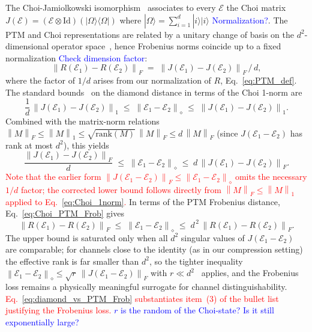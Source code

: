 \documentclass[%
 reprint,
superscriptaddress,
 amsmath,amssymb,
 aps,
]{revtex4-2}
\newcommand{\E}{\mathcal{E}}
\newcommand{\norm}[1]{\left\lVert#1\right\rVert}
\newcommand{\todoflag}[1]{\textcolor{red}{#1}}%
\newcommand{\yijian}[1]{\textcolor{blue}{#1}}
\begin{document}
The Choi-Jamiolkowski isomorphism~\cite{choi1975positive,jamiolkowski1972linear} associates to every $\E$ the Choi matrix $J(\E) = (\E\otimes\mathrm{Id})(|\Omega\rangle\langle\Omega|)$ where $|\Omega\rangle=\sum_{i=1}^d|i\rangle|i\rangle$ \yijian{Normalization?}. The PTM and Choi representations are related by a unitary change of basis on the $d^2$-dimensional operator space~\cite{greenbaum2015gst}, hence Frobenius norms coincide up to a fixed normalization  \yijian{Check dimension factor}:
\begin{equation}
    \norm{R(\E_1)-R(\E_2)}_F \;=\; \norm{J(\E_1)-J(\E_2)}_F\,/\,d,
    \label{eq:Choi_PTM_Frob}
\end{equation}
where the factor of $1/d$ arises from our normalization of $R$, Eq.~\eqref{eq:PTM_def}. The standard bounds~\cite{watrous2018theory,gilchrist2005distance} on the diamond distance in terms of the Choi 1-norm are
\begin{equation}
    \frac{1}{d}\,\norm{J(\E_1)-J(\E_2)}_1 \;\le\; \norm{\E_1-\E_2}_\diamond \;\le\; \norm{J(\E_1)-J(\E_2)}_1.
    \label{eq:Choi_1norm}
\end{equation}
Combined with the matrix-norm relations $\norm{M}_F \le \norm{M}_1 \le \sqrt{\mathrm{rank}(M)}\,\norm{M}_F \le d\,\norm{M}_F$ (since $J(\E_1-\E_2)$ has rank at most $d^2$), this yields
\begin{equation}
    \boxed{\;\frac{\norm{J(\E_1)-J(\E_2)}_F}{d} \;\le\; \norm{\E_1-\E_2}_\diamond \;\le\; d\,\norm{J(\E_1)-J(\E_2)}_F.\;}
    \label{eq:diamond_vs_Frob}
\end{equation}
\todoflag{Note that the earlier form $\norm{J(\E_1-\E_2)}_F \le \norm{\E_1-\E_2}_\diamond$ omits the necessary $1/d$ factor; the corrected lower bound follows directly from $\norm{M}_F\le\norm{M}_1$ applied to Eq.~\eqref{eq:Choi_1norm}.} In terms of the PTM Frobenius distance, Eq.~\eqref{eq:Choi_PTM_Frob} gives
\begin{equation}
    \norm{R(\E_1)-R(\E_2)}_F \;\le\; \norm{\E_1-\E_2}_\diamond \;\le\; d^{\,2}\,\norm{R(\E_1)-R(\E_2)}_F.
    \label{eq:diamond_vs_PTM_Frob}
\end{equation}
The upper bound is saturated only when all $d^2$ singular values of $J(\E_1-\E_2)$ are comparable; for channels close to the identity (as in our compression setting) the effective rank is far smaller than $d^2$, so the tighter inequality $\norm{\E_1-\E_2}_\diamond \le \sqrt{r}\,\norm{J(\E_1-\E_2)}_F$ with $r\ll d^2$~\cite{watrous2018theory} applies, and the Frobenius loss remains a physically meaningful surrogate for channel distinguishability. \todoflag{Eq.~\eqref{eq:diamond_vs_PTM_Frob} substantiates item~(3) of the bullet list justifying the Frobenius loss.}  \yijian{$r$ is the random of the Choi-state? Is it still exponentially large?}
\end{document}
